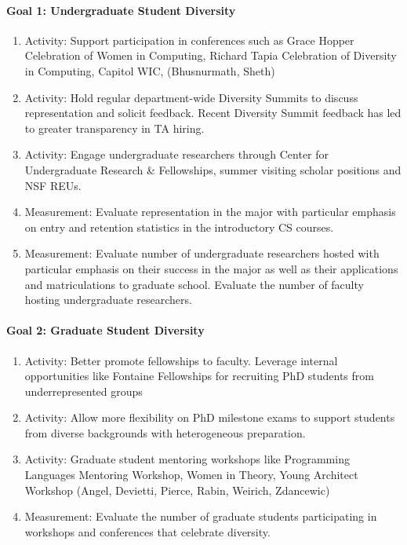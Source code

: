 

\paragraph*{Goal 1: Undergraduate Student Diversity}

\begin{enumerate}
\item Activity: Support participation in conferences such as Grace Hopper Celebration of Women in Computing, Richard Tapia Celebration of Diversity in Computing, Capitol WIC, (Bhusnurmath, Sheth)
\item Activity: Hold regular department-wide Diversity Summits to discuss representation and solicit feedback. Recent Diversity Summit feedback has led to greater transparency in TA hiring.
\item Activity: Engage undergraduate researchers through Center for Undergraduate Research \& Fellowships, summer visiting scholar positions and NSF REUs.
\item Measurement: Evaluate representation in the major with particular emphasis on entry and retention statistics in the introductory CS courses.
\item Measurement: Evaluate number of undergraduate researchers hosted with particular emphasis on their success in the major as well as their applications and matriculations to graduate school. Evaluate the number of faculty hosting undergraduate researchers.
\end{enumerate}

\paragraph*{Goal 2: Graduate Student Diversity}
\begin{enumerate}
\item Activity: Better promote fellowships to faculty. Leverage internal opportunities like Fontaine Fellowships for recruiting PhD students from underrepresented groups
\item Activity: Allow more flexibility on PhD milestone exams to support students from diverse backgrounds with heterogeneous preparation.
\item Activity: Graduate student mentoring workshops like Programming Languages Mentoring Workshop, Women in Theory, Young Architect Workshop (Angel, Devietti, Pierce, Rabin, Weirich, Zdancewic)
\item Measurement: Evaluate the number of graduate students participating in workshops and conferences that celebrate diversity.
\end{enumerate}

